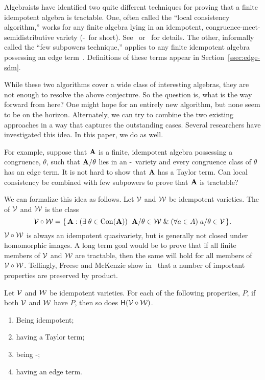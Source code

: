 Algebraists have identified two quite different techniques for proving that a finite idempotent algebra is tractable. One, often called the ``local consistency algorithm,'' works for any finite algebra lying in an idempotent, congruence-meet-semidistributive variety (\sd-\meet\ for short). See~\cite{MR2648455} or~\cite{MR2893395} for details. The other, informally called the ``few subpowers technique,'' applies to any finite idempotent algebra possessing an edge term~\cite{MR2678065}. Definitions of these terms appear in Section~\ref{ssec:edge-sdm}. 

While these two algorithms cover a wide class of interesting algebras, they are not enough to resolve the above conjecture. So the question is, what is the way forward from here? One might hope for an entirely new algorithm, but none seem to be on the horizon. Alternately, we can try to combine the two existing approaches in a way that captures the outstanding cases. Several researchers have investigated this idea. In this paper, we do as well.

For example, suppose that $\mathbf{A}$ is a finite, idempotent algebra possessing a congruence, $\theta$, such that $\mathbf{A}/\theta$ lies in an \sd-\meet\ variety and every congruence class of $\theta$ has an edge term. It is not hard to show that $\mathbf{A}$ has a Taylor term. Can local consistency be combined with few subpowers to prove that $\mathbf{A}$ is tractable? 

We can formalize this idea as follows. Let $\mathcal{V}$ and $\mathcal{W}$ be idempotent varieties. The  of $\mathcal{V}$ and $\mathcal{W}$ is the class
\begin{equation*}
\mathcal{V} \circ \mathcal{W} = \{\,\mathbf{A} : (\exists\; \theta\in \operatorname{Con}(\mathbf{A}))\;\;\mathbf{A}/\theta \in \mathcal{W} \mathrel{\&} (\forall a\in A)\;a/\theta \in \mathcal{V}\,\}.
\end{equation*}
$\mathcal{V}\circ \mathcal{W}$ is always an idempotent quasivariety, but is generally not closed under homomorphic images. A long term goal would be to prove that if all finite members of $\mathcal{V}$ and $\mathcal{W}$ are tractable, then the same will hold for all members of $\mathcal{V}\circ \mathcal{W}$. Tellingly, Freese and McKenzie show in~\cite{FreeseMcKenzie2016} that a number of important properties are preserved by \malcev product.

\begin{theorem}\label{thm:robust}
Let $\mathcal{V}$ and $\mathcal{W}$ be idempotent varieties. For each of the following properties, $P$\!, if both $\mathcal{V}$ and $\mathcal{W}$ have $P$\!, then so does  $\mathsf{H}(\mathcal{V}\circ \mathcal{W})$.
\begin{enumerate}
\item Being idempotent;
\item
having a Taylor term;
\item
being \sd-\meet;
\item
having an edge term.
\end{enumerate}
\end{theorem}

